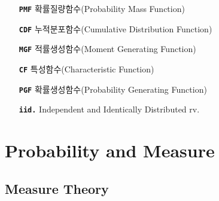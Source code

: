 \documentclass[graybox,envcountchap,envcountsame,sectrefs,fleqn]{svmono}
\begin{document}
\begin{itemize}
    \item[\texttt{\textbf{PMF}}]{확률질량함수(Probability Mass Function)}
    \item[\texttt{\textbf{CDF}}]{누적분포함수(Cumulative Distribution Function)}
    \item[\texttt{\textbf{MGF}}]{적률생성함수(Moment Generating Function)}
    \item[\texttt{\textbf{CF}}]{특성함수(Characteristic Function)}
    \item[\texttt{\textbf{PGF}}]{확률생성함수(Probability Generating Function)}
    \item[\texttt{\textbf{iid.}}]{Independent and Identically Distributed rv.}
\end{itemize}

\tableofcontents

\mainmatter%

\part{Probability and Measure}

\chapter{Measure Theory}




% 



% 

\backmatter%
\end{document}

